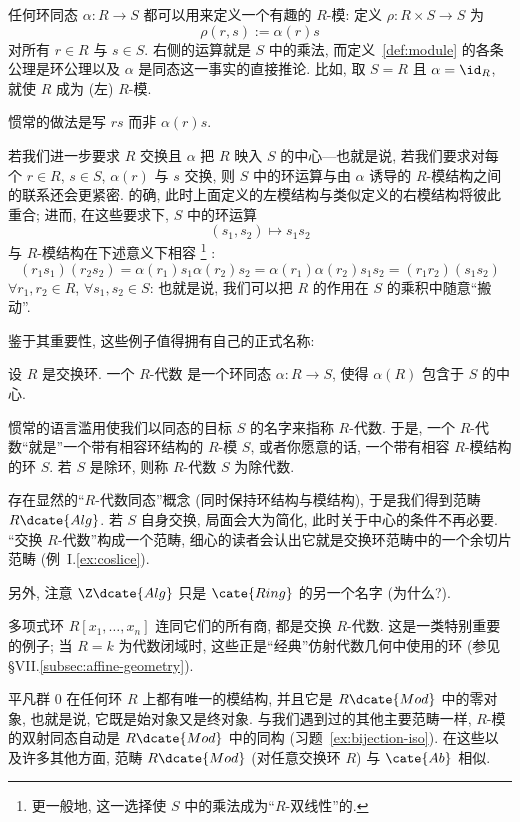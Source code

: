 \begin{example}
\label{ex:R-algebra}
任何环同态 $\alpha : R \to S$ 都可以用来定义一个有趣的 $R$-模: 定义 $\rho : R \times S \to S$ 为
\[
\rho(r, s) := \alpha(r)s
\]
对所有 $r \in R$ 与 $s \in S$. 右侧的运算就是 $S$ 中的乘法, 而定义~\ref{def:module} 的各条公理是环公理以及 $\alpha$ 是同态这一事实的直接推论. 比如, 取 $S = R$ 且 $\alpha = \id_R$, 就使 $R$ 成为 (左) $R$-模.

惯常的做法是写 $rs$ 而非 $\alpha(r)s$.

若我们进一步要求 $R$ 交换且 $\alpha$ 把 $R$ 映入 $S$ 的中心---也就是说, 若我们要求对每个 $r \in R$, $s \in S$, $\alpha(r)$ 与 $s$ 交换, 则 $S$ 中的环运算与由 $\alpha$ 诱导的 $R$-模结构之间的联系还会更紧密. 的确, 此时上面定义的左模结构与类似定义的右模结构将彼此重合; 进而, 在这些要求下, $S$ 中的环运算
\[
(s_1, s_2) \mapsto s_1 s_2
\]
与 $R$-模结构在下述意义下相容%
\footnote{更一般地, 这一选择使 $S$ 中的乘法成为``$R$-双线性''的.}%
:
\[
(r_1 s_1)(r_2 s_2) = \alpha(r_1) s_1 \alpha(r_2) s_2 = \alpha(r_1)\alpha(r_2) s_1 s_2 = (r_1 r_2)(s_1 s_2)
\]
$\forall r_1, r_2 \in R$, $\forall s_1, s_2 \in S$: 也就是说, 我们可以把 $R$ 的作用在 $S$ 的乘积中随意``搬动''.

鉴于其重要性, 这些例子值得拥有自己的正式名称:
\end{example}

\begin{definition}
\label{def:R-algebra}
设 $R$ 是交换环. 一个 $R$-代数%
是一个环同态 $\alpha : R \to S$, 使得 $\alpha(R)$ 包含于 $S$ 的中心.
\end{definition}

惯常的语言滥用使我们以同态的目标 $S$ 的名字来指称 $R$-代数. 于是, 一个 $R$-代数``就是''一个带有相容环结构的 $R$-模 $S$, 或者你愿意的话, 一个带有相容 $R$-模结构的环 $S$. 若 $S$ 是除环, 则称 $R$-代数 $S$ 为除代数.

存在显然的``$R$-代数同态''概念 (同时保持环结构与模结构), 于是我们得到范畴 $R\dcate{Alg}$. 若 $S$ 自身交换, 局面会大为简化, 此时关于中心的条件不再必要. ``交换 $R$-代数''构成一个范畴, 细心的读者会认出它就是交换环范畴中的一个余切片范畴 (例~I.\ref{ex:coslice}).

另外, 注意 $\Z\dcate{Alg}$ 只是 $\cate{Ring}$ 的另一个名字 (为什么?).

多项式环 $R[x_1, \ldots, x_n]$ 连同它们的所有商, 都是交换 $R$-代数. 这是一类特别重要的例子; 当 $R = k$ 为代数闭域时, 这些正是``经典''仿射代数几何中使用的环 (参见 \S VII.\ref{subsec:affine-geometry}).

平凡群 $0$ 在任何环 $R$ 上都有唯一的模结构, 并且它是 $R\dcate{Mod}$ 中的零对象, 也就是说, 它既是始对象又是终对象. 与我们遇到过的其他主要范畴一样, $R$-模的双射同态自动是 $R\dcate{Mod}$ 中的同构 (习题~\ref{ex:bijection-iso}). 在这些以及许多其他方面, 范畴 $R\dcate{Mod}$ (对任意交换环 $R$) 与 $\cate{Ab}$ 相似.


